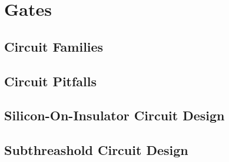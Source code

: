 \section{Gates}

\subsection{Circuit Families}

\subsection{Circuit Pitfalls}

\subsection{Silicon-On-Insulator Circuit Design}

\subsection{Subthreashold Circuit Design}
